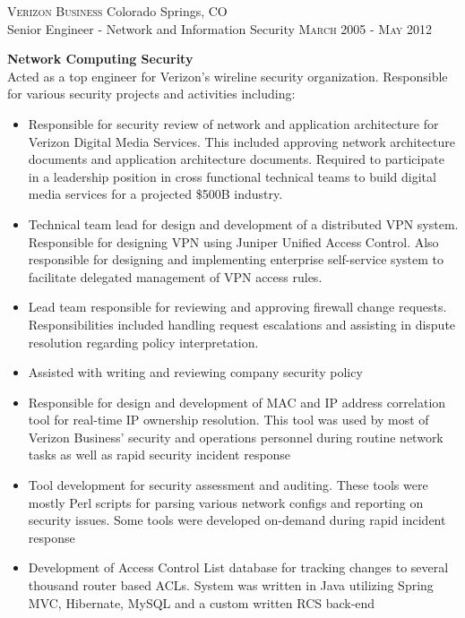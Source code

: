 
\textsc{Verizon Business} \hfill Colorado Springs, CO\\
Senior Engineer - Network and Information Security \hfill \textsc{March 2005} - \textsc{May 2012}

\textbf{Network Computing Security}\\
Acted as a top engineer for Verizon’s wireline security organization.
Responsible for various security projects and activities including:

\begin{itemize}
\item
Responsible for security review of network and application architecture for
Verizon Digital Media Services.  This included approving network architecture
documents and application architecture documents.  Required to participate in a
leadership position in cross functional technical teams to build digital media
services for a projected \$500B industry.

\item
Technical team lead for design and development of a distributed VPN system.
Responsible for designing VPN using Juniper Unified Access Control.  Also
responsible for designing and implementing enterprise self-service system to
facilitate delegated management of VPN access rules.

\item
Lead team responsible for reviewing and approving firewall change requests.
Responsibilities included handling request escalations and assisting in dispute
resolution regarding policy interpretation.

\item
Assisted with writing and reviewing company security policy

\item
Responsible for design and development of MAC and IP address correlation tool
for real-time IP ownership resolution.  This tool was used by most of Verizon
Business’ security and operations personnel during routine network tasks as well
as rapid security incident response

\item
Tool development for security assessment and auditing. These tools were mostly
Perl scripts for parsing various network configs and reporting on security
issues.  Some tools were developed on-demand during rapid incident response

\item 
Development of Access Control List database for tracking changes to several
thousand router based ACLs. System was written in Java utilizing Spring MVC,
Hibernate, MySQL and a custom written RCS back-end

\end{itemize}

